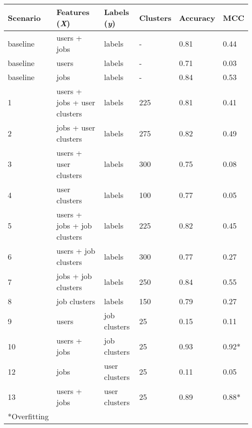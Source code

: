 \begin{tabular}{llllll}
\toprule
\textbf{Scenario}   & \textbf{Features (\textit{X})}    & \textbf{Labels (\textit{y})}  & \textbf{Clusters} & \textbf{Accuracy} & \textbf{MCC}        \\
\midrule
baseline            & users + jobs                      & labels                        & -                     & 0.81              & 0.44            \\
baseline            & users                             & labels                        & -                     & 0.71              & 0.03            \\
baseline            & jobs                              & labels                        & -                     & 0.84              & 0.53            \\
\midrule
1                   & users + jobs + user clusters      & labels                        & 225                   & 0.81              & 0.41            \\ %
2                   & jobs + user clusters              & labels                        & 275                   & 0.82              & 0.49            \\ %
3                   & users + user clusters             & labels                        & 300                   & 0.75              & 0.08            \\ %
4                   & user clusters                     & labels                        & 100                   & 0.77              & 0.05            \\ %
5                   & users + jobs + job clusters       & labels                        & 225                   & 0.82              & 0.45            \\ %
6                   & users + job clusters              & labels                        & 300                   & 0.77              & 0.27            \\ %
7                   & jobs + job clusters               & labels                        & 250                   & 0.84              & 0.55            \\ %
8                   & job clusters                      & labels                        & 150                   & 0.79              & 0.27            \\ %
9                   & users                             & job clusters                  & 25                    & 0.15              & 0.11            \\ %
10                  & users + jobs                      & job clusters                  & 25                    & 0.93              & 0.92*            \\ %
12                  & jobs                              & user clusters                 & 25                    & 0.11              & 0.05            \\ %
13                  & users + jobs                      & user clusters                 & 25                    & 0.89              & 0.88*            \\ %
\bottomrule
\tiny{*Overfitting} \\
\end{tabular}
